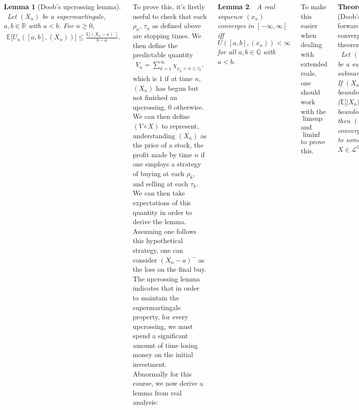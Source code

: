 \documentclass{tikzposter} %
\newtheorem{theorem}{Theorem}
\newtheorem{lemma}[theorem]{Lemma}
\begin{document}
\begin{columns}
{    \begin{lemma}[Doob's upcrossing lemma]
    \ Let $(X_{n})$ be a supermartingale, $a, b \in \mathbb{R}$ with $a < b$. For $n \ge 0$,
    \begin{align*}
      \mathbb{E}\big[U_{n}([a,b],(X_{n}))\big] \le \frac{\mathbb{E}\big[(X_{n}-a)^{-}\big]}{b-a}.
    \end{align*}
    \end{lemma}
    \hphantom{}

    To prove this, it's firstly useful to check that each $\rho_{n}$, $\tau_{n}$ as defined above are stopping times. We then define the predictable quantity
    \begin{align*}
      V_{n} = \sum_{k = 1}^{\infty} \chi_{\rho_{k} < n \le \tau_{k}},
    \end{align*}
    which is $1$ if at time $n$, $(X_{n})$ has begun but not finished an upcrossing, $0$ otherwise. We can then define $(V \circ X)$ to represent, understanding $(X_{n})$ as the price of a stock, the profit made by time $n$ if one employs a strategy of buying at each $\rho_{k}$, and selling at each $\tau_{k}$. We can then take expectations of this quantity in order to derive the lemma. \\

    Assuming one follows this hypothetical strategy, one can consider $(X_{n}-a)^{-}$ as the loss on the final buy. The upcrossing lemma indicates that in order to maintain the supermartingale property, for every upcrossing, we must spend a significant amount of time losing money on the initial investment. \\

    Abnormally for this course, we now derive a lemma from real analysis:
    \begin{lemma}
    \ A real sequence $(x_{n})$ converges in $[-\infty,\infty]$ iff $U([a,b],(x_{n})) < \infty$ for all $a,b \in \mathbb{Q}$ with $a < b$.
    \end{lemma}
    \hphantom{}

    To make this easier when dealing with extended reals, one should work with the $\limsup$ and $\liminf$ to prove this. \\

    \begin{theorem}[Doob's forward convergence theorem]
    \ Let $(X_{n})$ be a super- or submartingale. If $(X_{n})$ is bounded in $\mathcal{L}^{1}$ ($\mathbb{E}\big[|X_{n}|\big]$ is bounded), then $(X_{n})$ converges a.s. to some $X \in \mathcal{L}^{1}$.
    \end{theorem}
    \hphantom{}

}
\end{columns}
\end{document}

